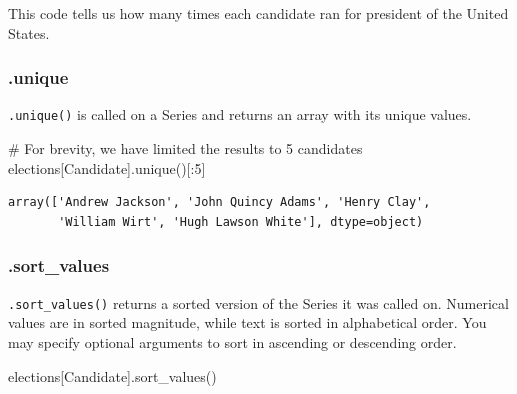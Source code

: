 \documentclass[
  letterpaper,
  DIV=11,
  numbers=noendperiod]{scrreprt}
\newenvironment{Shaded}{\begin{snugshade}}{\end{snugshade}}
\newcommand{\CommentTok}[1]{\textcolor[rgb]{0.37,0.37,0.37}{#1}}
\newcommand{\DecValTok}[1]{\textcolor[rgb]{0.68,0.00,0.00}{#1}}
\newcommand{\NormalTok}[1]{\textcolor[rgb]{0.00,0.23,0.31}{#1}}
\newcommand{\StringTok}[1]{\textcolor[rgb]{0.13,0.47,0.30}{#1}}
\begin{document}
This code tells us how many times each candidate ran for president of
the United States.

\hypertarget{unique}{%
\subsubsection{.unique}\label{unique}}

\texttt{.unique()} is called on a Series and returns an array with its
unique values.

\begin{Shaded}
\begin{Highlighting}[]
\CommentTok{\# For brevity, we have limited the results to 5 candidates }
\NormalTok{elections[}\StringTok{\textquotesingle{}Candidate\textquotesingle{}}\NormalTok{].unique()[:}\DecValTok{5}\NormalTok{]}
\end{Highlighting}
\end{Shaded}

\begin{verbatim}
array(['Andrew Jackson', 'John Quincy Adams', 'Henry Clay',
       'William Wirt', 'Hugh Lawson White'], dtype=object)
\end{verbatim}

\hypertarget{sort_values}{%
\subsubsection{.sort\_values}\label{sort_values}}

\texttt{.sort\_values()} returns a sorted version of the Series it was
called on. Numerical values are in sorted magnitude, while text is
sorted in alphabetical order. You may specify optional arguments to sort
in ascending or descending order.

\begin{Shaded}
\begin{Highlighting}[]
\NormalTok{elections[}\StringTok{\textquotesingle{}Candidate\textquotesingle{}}\NormalTok{].sort\_values()}
\end{Highlighting}
\end{Shaded}
\end{document}
